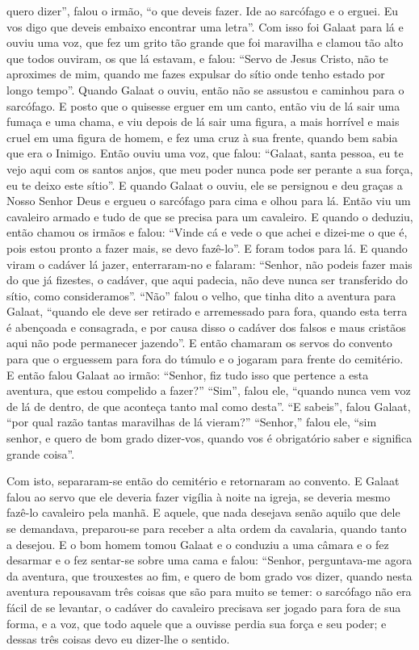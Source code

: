 quero dizer”, falou o irmão, “o que deveis fazer. Ide ao sarcófago e o erguei.
Eu vos digo que deveis embaixo encontrar uma letra”. Com isso foi
Galaat para lá e ouviu uma voz, que fez um grito tão grande que foi maravilha e
clamou tão alto que todos ouviram, os que lá estavam, e falou: “Servo de Jesus
Cristo, não te aproximes de mim, quando me fazes expulsar do sítio onde tenho
estado por longo tempo”. Quando Galaat o ouviu,  então não se assustou e
caminhou para o sarcófago. E posto que o quisesse  erguer em um canto, então
viu de lá sair uma fumaça e uma chama, e viu depois de lá sair uma figura, a
mais horrível e mais cruel em uma figura de homem, e fez uma cruz à sua frente,
quando bem sabia que era o Inimigo. Então ouviu uma voz, que falou: “Galaat,
santa pessoa, eu te vejo aqui com os santos anjos, que meu poder nunca pode ser
perante a sua força, eu te deixo este sítio”. E quando Galaat o ouviu, ele se
persignou e deu graças a Nosso Senhor Deus e ergueu o sarcófago para cima e
olhou para lá. Então viu um cavaleiro armado e tudo de que se precisa
para um cavaleiro. E quando o deduziu, então chamou os irmãos e falou: “Vinde
cá e vede o que achei e dizei-me o que é, pois estou pronto a fazer mais, se
devo fazê-lo”.  E foram todos para lá. E quando viram o cadáver lá
jazer, enterraram-no e falaram: “Senhor, não podeis fazer mais do que já
fizestes, o cadáver, que aqui padecia, não deve nunca ser transferido do sítio,
como consideramos”. “Não” falou o velho, que tinha dito a aventura para Galaat,
“quando ele deve ser retirado e arremessado para fora, quando esta terra é
abençoada e consagrada, e por causa disso o cadáver dos falsos e maus cristãos
aqui não pode permanecer jazendo”. E então chamaram os servos do
convento para que o erguessem para fora do túmulo e o jogaram para frente do
cemitério. E então falou Galaat ao irmão: “Senhor, fiz tudo isso que pertence a
esta aventura, que estou compelido a fazer?” “Sim”, falou ele, “quando nunca
vem voz de lá de dentro, de que aconteça tanto mal como desta”. “E
sabeis”, falou Galaat, “por qual razão tantas maravilhas de lá vieram?”
“Senhor,” falou ele, “sim senhor, e quero de bom grado dizer-vos, quando vos é
obrigatório saber e significa grande coisa”.

Com isto, separaram-se então do cemitério e retornaram ao convento. E Galaat
falou ao servo que ele deveria fazer vigília à noite na igreja, se deveria
mesmo fazê-lo cavaleiro pela manhã. E aquele, que nada desejava senão aquilo
que dele se demandava, preparou-se para receber a alta ordem da cavalaria,
quando tanto a desejou. E o bom homem tomou Galaat e o conduziu a uma
câmara e o fez desarmar e o fez sentar-se sobre uma cama e falou: “Senhor,
perguntava-me agora da aventura, que trouxestes ao fim, e quero de bom grado
vos dizer, quando nesta aventura repousavam três coisas que são para muito se
temer: o sarcófago não era fácil de se levantar, o cadáver do cavaleiro
precisava ser jogado para fora de sua forma, e a voz, que todo aquele que a
ouvisse perdia sua força e seu poder; e dessas três coisas devo eu dizer-lhe o
sentido. 

